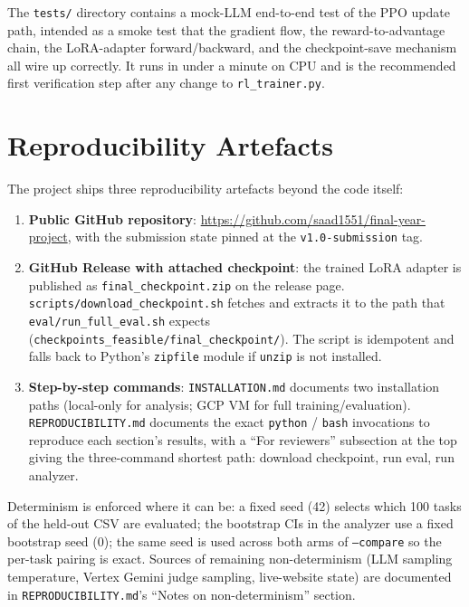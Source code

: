 \documentclass[12pt,a4paper]{report}
\begin{document}
The \texttt{tests/} directory contains a mock-LLM end-to-end test of the PPO update path, intended as a smoke test that the gradient flow, the reward-to-advantage chain, the LoRA-adapter forward/backward, and the checkpoint-save mechanism all wire up correctly. It runs in under a minute on CPU and is the recommended first verification step after any change to \texttt{rl\_trainer.py}.

\section{Reproducibility Artefacts}\label{sec:impl-repro}

The project ships three reproducibility artefacts beyond the code itself:

\begin{enumerate}
  \item \textbf{Public GitHub repository}: \url{https://github.com/saad1551/final-year-project}, with the submission state pinned at the \texttt{v1.0-submission} tag.
  \item \textbf{GitHub Release with attached checkpoint}: the trained LoRA adapter is published as \texttt{final\_checkpoint.zip} on the release page. \texttt{scripts/download\_checkpoint.sh} fetches and extracts it to the path that \texttt{eval/run\_full\_eval.sh} expects (\texttt{checkpoints\_feasible/final\_checkpoint/}). The script is idempotent and falls back to Python's \texttt{zipfile} module if \texttt{unzip} is not installed.
  \item \textbf{Step-by-step commands}: \texttt{INSTALLATION.md} documents two installation paths (local-only for analysis; GCP VM for full training/evaluation). \texttt{REPRODUCIBILITY.md} documents the exact \texttt{python} / \texttt{bash} invocations to reproduce each section's results, with a ``For reviewers'' subsection at the top giving the three-command shortest path: download checkpoint, run eval, run analyzer.
\end{enumerate}

Determinism is enforced where it can be: a fixed seed (42) selects which 100 tasks of the held-out CSV are evaluated; the bootstrap CIs in the analyzer use a fixed bootstrap seed (0); the same seed is used across both arms of \texttt{--compare} so the per-task pairing is exact. Sources of remaining non-determinism (LLM sampling temperature, Vertex Gemini judge sampling, live-website state) are documented in \texttt{REPRODUCIBILITY.md}'s ``Notes on non-determinism'' section.
\end{document}
